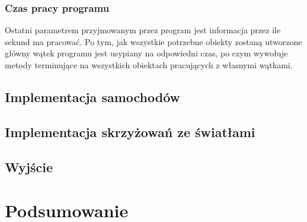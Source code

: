 \documentclass[a4paper]{article}
\begin{document}
\subsubsection{Czas pracy programu}
Ostatni parametrem przyjmowanym przez program jest informacja przez ile sekund ma pracować. Po tym, jak wszystkie potrzebne obiekty zostaną utworzone główny wątek programu jest usypiany na odpowiedni czas, po czym wywołuje metody terminujące na wszystkich obiektach pracujących z własnymi wątkami.

\subsection{Implementacja samochodów}
\subsection{Implementacja skrzyżowań ze światłami}
\subsection{Wyjście}
\section{Podsumowanie}
\end{document}
